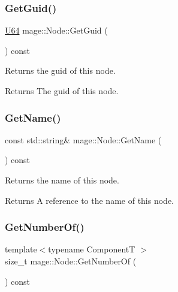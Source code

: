 \subsubsection{\texorpdfstring{Get\+Guid()}{GetGuid()}}
{\footnotesize\ttfamily \mbox{\hyperlink{namespacemage_ae0ad2dd0035dba92ed0f2e84c182b03b}{U64}} mage\+::\+Node\+::\+Get\+Guid (\begin{DoxyParamCaption}{ }\end{DoxyParamCaption}) const\hspace{0.3cm}{\ttfamily [noexcept]}}

Returns the guid of this node.

\begin{DoxyReturn}{Returns}
The guid of this node. 
\end{DoxyReturn}
\mbox{\label{classmage_1_1_node_a66c1c1c76861ecb7d26252a9da865f63}} 
\subsubsection{\texorpdfstring{Get\+Name()}{GetName()}}
{\footnotesize\ttfamily const std\+::string\& mage\+::\+Node\+::\+Get\+Name (\begin{DoxyParamCaption}{ }\end{DoxyParamCaption}) const\hspace{0.3cm}{\ttfamily [noexcept]}}

Returns the name of this node.

\begin{DoxyReturn}{Returns}
A reference to the name of this node. 
\end{DoxyReturn}
\mbox{\label{classmage_1_1_node_a0cd486de1639d5af2618ba913124fbe6}} 
\subsubsection{\texorpdfstring{Get\+Number\+Of()}{GetNumberOf()}}
{\footnotesize\ttfamily template$<$typename ComponentT $>$ \\
size\+\_\+t mage\+::\+Node\+::\+Get\+Number\+Of (\begin{DoxyParamCaption}{ }\end{DoxyParamCaption}) const\hspace{0.3cm}{\ttfamily [noexcept]}}

